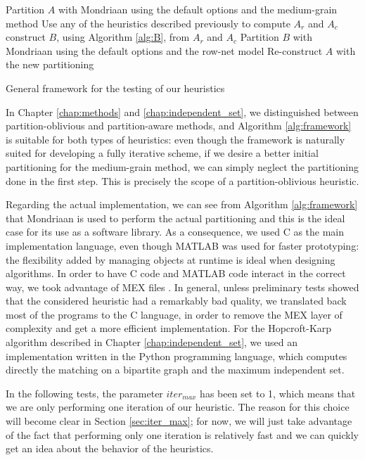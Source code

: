 \begin{algorithm}[h]
	\begin{algorithmic}
		\State Partition $A$ with Mondriaan using the default options and the medium-grain method
		\State Use any of the heuristics described previously to compute $A_r$ and $A_c$
		\State construct $B$, using Algorithm \ref{alg:B}, from $A_r$ and $A_c$
		\State Partition $B$ with Mondriaan using the default options and the row-net model
		\State Re-construct $A$ with the new partitioning
		\EndFor
	\end{algorithmic}
	\caption{General framework for the testing of our heuristics} \label{alg:framework}
\end{algorithm}

In Chapter \ref{chap:methods} and \ref{chap:independent_set}, we distinguished between partition-oblivious and partition-aware methods, and Algorithm \ref{alg:framework} is suitable for both types of heuristics: even though the framework is naturally suited for developing a fully iterative scheme, if we desire a better initial partitioning for the medium-grain method, we can simply neglect the partitioning done in the first step. This is precisely the scope of a partition-oblivious heuristic.

Regarding the actual implementation, we can see from Algorithm \ref{alg:framework} that Mondriaan is used to perform the actual partitioning and this is the ideal case for its use as a software library. As a consequence, we used C as the main implementation language, even though MATLAB was used for faster prototyping: the flexibility added by managing objects at runtime  is ideal when designing algorithms. In order to have C code and MATLAB code interact in the correct way, we took advantage of MEX files \cite{mex}. In general, unless preliminary tests showed that the considered heuristic had a remarkably bad quality, we translated back most of the programs to the C language, in order to remove the MEX layer of complexity and get a more efficient implementation. For the Hopcroft-Karp algorithm described in Chapter \ref{chap:independent_set}, we used an implementation \cite{hkarp_impl} written in the Python programming language, which computes directly the matching on a bipartite graph and the maximum independent set. 

In the following tests, the parameter $iter_{max}$ has been set to 1, which means that we are only performing one iteration of our heuristic. The reason for this choice will become clear in Section \ref{sec:iter_max}; for now, we will just take advantage of the fact that performing only one iteration is relatively fast and we can quickly get an idea about the behavior of the heuristics.

